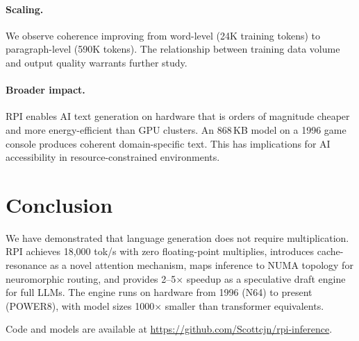 \documentclass[10pt,twocolumn]{article}
\begin{document}
\paragraph{Scaling.} We observe coherence improving from word-level (24K training tokens) to paragraph-level (590K tokens). The relationship between training data volume and output quality warrants further study.

\paragraph{Broader impact.} RPI enables AI text generation on hardware that is orders of magnitude cheaper and more energy-efficient than GPU clusters. An 868\,KB model on a 1996 game console produces coherent domain-specific text. This has implications for AI accessibility in resource-constrained environments.

\section{Conclusion}

We have demonstrated that language generation does not require multiplication. RPI achieves 18,000 tok/s with zero floating-point multiplies, introduces cache-resonance as a novel attention mechanism, maps inference to NUMA topology for neuromorphic routing, and provides 2--5$\times$ speedup as a speculative draft engine for full LLMs. The engine runs on hardware from 1996 (N64) to present (POWER8), with model sizes 1000$\times$ smaller than transformer equivalents.

Code and models are available at \url{https://github.com/Scottcjn/rpi-inference}.
\end{document}
